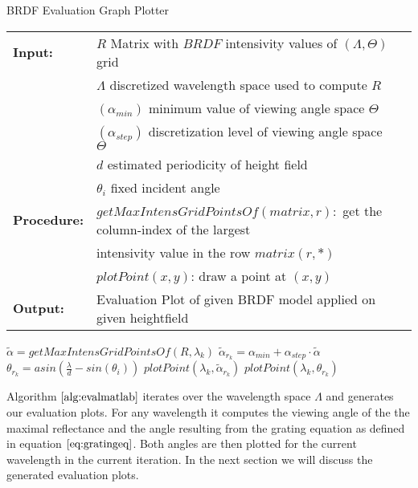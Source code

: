 \begin{algorithm}[H]
\caption{BRDF Evaluation Graph Plotter}
\begin{table}[H]
  \begin{tabular}{@{}lll@{}}
    \textbf{Input:} & $R$ Matrix with $BRDF$ intensivity values of $(\Lambda, \Theta)$ grid \\
    & $\Lambda$ discretized wavelength space used to compute $R$ \\
    & $(\alpha_{min})$ minimum value of viewing angle space $\Theta$ \\
    & $(\alpha_{step})$ discretization level of viewing angle space $\Theta$ \\
    & $d$ estimated periodicity of height field \\
    & $\theta_i$ fixed incident angle \\
    \textbf{Procedure:} & $getMaxIntensGridPointsOf(matrix,r):$ get the column-index of the largest  \\
    & \quad \quad \quad \quad \quad \quad \quad \quad \quad \quad \quad \quad \quad \quad \quad \quad \quad \quad intensivity value in the row $matrix(r,*)$\\
    &$plotPoint(x,y)$: draw a point at $(x,y)$ \\
    \textbf{Output:} & Evaluation Plot of given BRDF model applied on given heightfield \\
  \end{tabular} 
\end{table}
\setlength{\fboxrule}{0pt} 
\begin{boxedminipage}{1.0\textwidth}
  \begin{algorithmic}[1]
      \State $\widetilde{\alpha} = getMaxIntensGridPointsOf(R, \lambda_k)$
      \State $\widetilde{\alpha}_{r_k} = \alpha_{min} + \alpha_{step} \cdot \widetilde{\alpha}$
      \State $\theta_{r_k} = asin\left( \frac{\lambda}{d} - sin(\theta_i) \right)$
      \State $plotPoint(\lambda_k, \widetilde{\alpha}_{r_k})$
      \State $plotPoint(\lambda_k, \theta_{r_k})$
    \EndFor
  \end{algorithmic}
  \end{boxedminipage}
  \vskip1.5pt
\label{alg:evalmatlab}
\end{algorithm}

Algorithm $\ref{alg:evalmatlab}$ iterates over the wavelength space $\Lambda$ and generates our evaluation plots. For any wavelength it computes the viewing angle of the the maximal reflectance and the angle resulting from the grating equation as defined in equation $\ref{eq:gratingeq}$. Both angles are then plotted for the current wavelength in the current iteration. In the next section we will discuss the generated evaluation plots.

